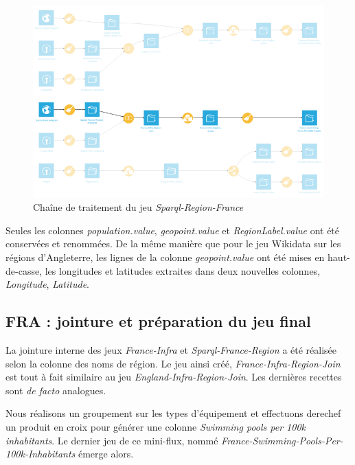 \documentclass[hidelinks, 12pt]{report}
\begin{document}
\begin{center}
	\begin{figure}[H]
		\setlength{\belowcaptionskip}{-35pt}
		\includegraphics[scale=0.55]{images/flow-swim-fra-sparql.png}
		\caption{Chaîne de traitement du jeu \textit{Sparql-Region-France}}
	\end{figure}
\end{center}

Seules les colonnes \textit{population.value}, \textit{geopoint.value} et \textit{RegionLabel.value} ont été conservées et renommées. De la même manière que pour le jeu Wikidata sur les régions d'Angleterre, les lignes de la colonne \textit{geopoint.value} ont été mises en haut-de-casse, les longitudes et latitudes extraites dans deux nouvelles colonnes, \textit{Longitude}, \textit{Latitude}.





%





\subsection{FRA : jointure et préparation du jeu final}

La jointure interne des jeux \textit{France-Infra} et \textit{Sparql-France-Region} a été réalisée selon la colonne des noms de région. Le jeu ainsi créé, \textit{France-Infra-Region-Join} est tout à fait similaire au jeu \textit{England-Infra-Region-Join}. Les dernières recettes sont \textit{de facto} analogues.

Nous réalisons un groupement sur les types d'équipement et effectuons derechef un produit en croix pour générer une colonne \textit{Swimming pools per 100k inhabitants}. Le dernier jeu de ce mini-flux, nommé \textit{France-Swimming-Pools-Per-100k-Inhabitants} émerge alors. 
\end{document}
